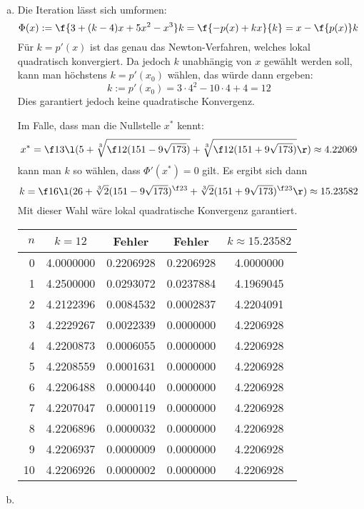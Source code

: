 \documentclass[a4paper]{scrartcl}
\begin{document}
\begin{aufgabe}~

	\begin{enumerate}[a)]
		\item
			Die Iteration lässt sich umformen:
			\[
				\Phi(x) := \f {3 + (k-4)x + 5x^2 - x^3}k = \f {-p(x) + kx}{k} = x - \f {p(x)}k
			\]
			Für $k = p'(x)$ ist das genau das Newton-Verfahren, welches lokal quadratisch konvergiert.
			Da jedoch $k$ unabhängig von $x$ gewählt werden soll, kann man höchstens $k = p'(x_0)$ wählen, das würde dann ergeben:
			\[
				k := p'(x_0) = 3\cdot 4^2 - 10\cdot 4 + 4 = 12
			\]
			Dies garantiert jedoch keine quadratische Konvergenz.

			Im Falle, dass man die Nullstelle $x^*$ kennt:
			\[
				x^* = \f 13 \l( 5 + \sqrt[3]{\f 12 (151 - 9 \sqrt {173})} + \sqrt[3]{\f 12 (151 + 9\sqrt{173})} \r) \approx 4.22069
			\]
			kann man $k$ so wählen, dass $\Phi'(x^*) = 0$ gilt.
			Es ergibt sich dann
			\[
				k = \f 16 \l( 26 + \sqrt[3]{2}(151 - 9\sqrt{173})^{\f 23} + \sqrt[3]{2} (151 + 9\sqrt{173})^{\f 23} \r) \approx 15.23582
			\]
			Mit dieser Wahl wäre lokal quadratische Konvergenz garantiert.
			\begin{table}[h]
				\centering
				\begin{tabular}{r|cc|cc}
					$n$ & $k=12$ & Fehler & Fehler & $k\approx 15.23582$ \\\hline
0 & 4.0000000 & 0.2206928 & 0.2206928 & 4.0000000\\
1 & 4.2500000 & 0.0293072 & 0.0237884 & 4.1969045\\
2 & 4.2122396 & 0.0084532 & 0.0002837 & 4.2204091\\
3 & 4.2229267 & 0.0022339 & 0.0000000 & 4.2206928\\
4 & 4.2200873 & 0.0006055 & 0.0000000 & 4.2206928\\
5 & 4.2208559 & 0.0001631 & 0.0000000 & 4.2206928\\
6 & 4.2206488 & 0.0000440 & 0.0000000 & 4.2206928\\
7 & 4.2207047 & 0.0000119 & 0.0000000 & 4.2206928\\
8 & 4.2206896 & 0.0000032 & 0.0000000 & 4.2206928\\
9 & 4.2206937 & 0.0000009 & 0.0000000 & 4.2206928\\
10 & 4.2206926 & 0.0000002 & 0.0000000 & 4.2206928\\
				\end{tabular}				
			\end{table}
		\item

\end{enumerate}
\end{aufgabe}
\end{document}
